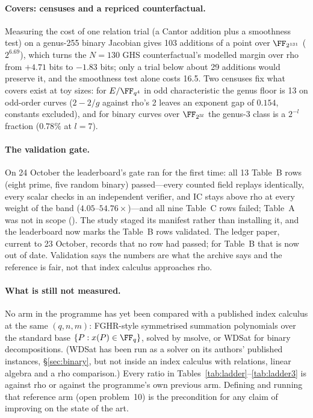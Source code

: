 \paragraph{Covers: censuses and a repriced counterfactual.} Measuring the
cost of one relation trial (a Cantor addition plus a smoothness test) on a
genus-255 binary Jacobian gives 103 additions of a point over $\FF_{2^{131}}$
($2^{6.69}$), which turns the $N=130$ GHS counterfactual's modelled margin
over rho from $+4.71$ bits to $-1.83$ bits; only a trial below about 29
additions would preserve it, and the smoothness test alone costs 16.5. Two
censuses fix what covers exist at toy sizes: for $E/\FF_{q^4}$ in odd
characteristic the genus floor is 13 on odd-order curves ($2-2/g$ against
rho's 2 leaves an exponent gap of $0.154$, constants excluded), and for
binary curves over $\FF_{2^{3l}}$ the genus-3 class is a $2^{-l}$ fraction
($0.78\%$ at $l=7$).

\paragraph{The validation gate.} On 24 October the leaderboard's gate ran
for the first time: all 13 Table~B rows (eight prime, five random binary)
passed---every counted field replays identically, every scalar checks in an
independent verifier, and IC stays above rho at every weight of the band
($4.05$--$54.76\times$)---and all nine Table~C rows failed; Table~A was not
in scope (). The study staged its
manifest rather than installing it, and the leaderboard now marks the
Table~B rows validated. The ledger paper, current to 23 October, records
that no row had passed; for Table~B that is now out of date. Validation
says the numbers are what the archive says and the reference is fair, not
that index calculus approaches rho.

\paragraph{What is still not measured.} No arm in the programme has yet
been compared with a published index calculus at the same $(q,n,m)$:
FGHR-style symmetrised summation polynomials over the standard base
$\{P: x(P)\in\FF_q\}$, solved by msolve, or WDSat for binary
decompositions. (WDSat has been run as a solver on its authors' published
instances, \S\ref{sec:binary}, but not inside an index calculus with
relations, linear algebra and a rho comparison.) Every ratio in Tables~\ref{tab:ladder}--\ref{tab:ladder3} is
against rho or against the programme's own previous arm. Defining and running
that reference arm (open problem~10) is the precondition for any claim of
improving on the state of the art.

